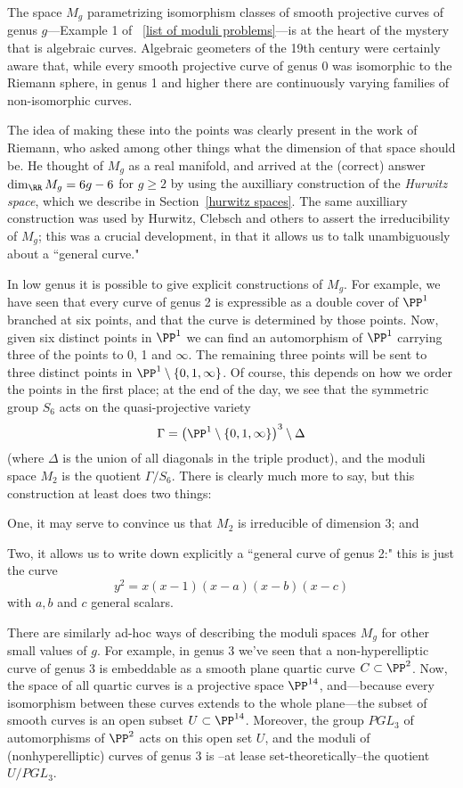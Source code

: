 The space $M_g$ parametrizing isomorphism classes of smooth projective curves of genus $g$---Example 1 of ~\ref{list of moduli problems}---is at the heart of the mystery that is algebraic curves. 
Algebraic geometers of the 19th century were certainly aware that, while every smooth projective curve of genus 0 was isomorphic to the Riemann sphere, in  genus 1 and higher there are continuously varying families of non-isomorphic curves. 

The idea of
making these into the points was clearly present in the work of Riemann, who asked among other things what the dimension of that space should be. He thought of $M_g$ as a real manifold, and arrived at the (correct) answer $\dim_\RR M_g = 6g-6$ for $g \geq 2$ by using the auxilliary construction of the \emph{Hurwitz space}, which we describe in Section~\ref{hurwitz spaces}. The same auxilliary construction was used by Hurwitz, Clebsch and others to assert the irreducibility of $M_g$; this was a crucial development, in that it allows us to talk unambiguously about a ``general curve."

In low genus it is possible to give explicit constructions of $M_g$. For example, we have seen that every curve of genus 2 is expressible as a double cover of $\PP^1$ branched at six points, and  that the curve is determined by those points. Now, given six distinct points in $\PP^1$ we can find an automorphism of $\PP^1$ carrying three of the points to 0, 1 and $\infty$. The remaining three points will be sent to three distinct points in $\PP^1 \setminus \{0, 1, \infty \} $. Of course, this depends on how we order the points in the first place; at the end of the day, we see that the symmetric group $S_6$ acts on the quasi-projective variety
$$
\Gamma = \left( \PP^1 \setminus \{0, 1, \infty \} \right)^3 \setminus \Delta
$$
(where $\Delta$ is the union of all diagonals in the triple product), and the moduli space $M_2$ is the quotient $\Gamma/S_6$. There is clearly much more to say, but this construction at least does two things:

One, it may serve to convince us that $M_2$ is irreducible of dimension 3; and

Two, it allows us to write down explicitly a ``general curve of genus 2:" this is just the curve
$$
y^2 = x(x-1)(x-a)(x-b)(x-c)
$$
with $a, b$ and $c$ general scalars.

There are similarly ad-hoc ways of describing the moduli spaces $M_g$ for other small values of $g$. For example, in genus 3 we've seen that a non-hyperelliptic curve of genus 3 is embeddable as a smooth plane quartic curve $C \subset \PP^2$. Now, the space of all quartic curves is a projective space $\PP^{14}$, and---because every isomorphism between these curves extends to the whole plane---the subset of smooth curves is an open subset $U \subset \PP^{14}$. Moreover, the group $PGL_3$ of automorphisms of $\PP^2$ acts on this open set $U$, and  the moduli of (nonhyperelliptic) curves of genus 3 is --at lease set-theoretically--the quotient $U/PGL_3$.

